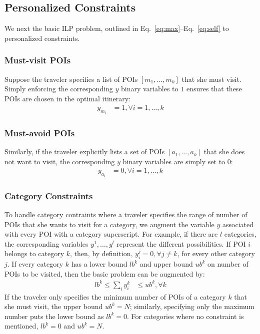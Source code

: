
\subsection{Personalized Constraints}
\label{sec:personalized}

We next the basic ILP problem, outlined in Eq.~\eqref{eq:max}--Eq.~\eqref{eq:self} to personalized constraints.

\subsubsection{\textbf{Must-visit POIs}}
\label{sec:must}

Suppose the traveler specifies a list of POIs $[m_1, \dots, m_k]$ that she
must visit.  Simply enforcing the corresponding $y$ binary variables to
$1$ ensures that these POIs are chosen in the optimal itinerary:
%
\begin{align}
	\label{eq:see}
	y_{m_i} & = 1, \forall i = 1, \dots, k
\end{align}

\subsubsection{\textbf{Must-avoid POIs}}
\label{sec:avoid}

Similarly, if the traveler explicitly lists a set of POIs $[a_1, \dots,
a_k]$ that she does not want to visit, the corresponding $y$ binary
variables are simply set to $0$:
%
\begin{align}
	\label{eq:avoid}
	y_{a_i} & = 0, \forall i = 1, \dots, k
\end{align}

\subsubsection{\textbf{Category Constraints}}
\label{sec:category}

To handle category contraints where a traveler specifies the range of
number of POIs that she wants to visit for a category, we augment the
variable $y$ associated with every POI with a category superscript.  For
example, if there are $l$ categories, the corresponding variables $y^1,
\dots, y^l$ represent the different possibilities.  If POI $i$ belongs to
category $k$, then, by definition, $y^j_i = 0, \forall j \neq k$, for
every other category $j$.  If every category $k$ has a lower bound $lb^k$
and upper bound $ub^k$ on number of POIs to be visited, then the basic
problem can be augmented by:
%
\begin{align}
	\label{eq:category}
	lb^k \leq \sum_{i} y^k_i & \leq ub^k, \forall k
\end{align}
%
If the traveler only specifies the minimum number of POIs of a category
$k$ that she must visit, the upper bound $ub^k = N$; similarly, specifying
only the maximum number puts the lower bound as $lb^k = 0$.  For
categories where no constraint is mentioned, $lb^k = 0$ and $ub^k = N$.

